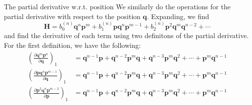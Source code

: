 \documentclass[aspectratio=169]{beamer}
\begin{document}
	\begin{frame}[allowframebreaks]{The partial derivative w.r.t. position}
		We similarly do the operations for the partial derivative with respect to the position $\textbf{q}$.
		Expanding, we find
		\begin{equation}
			\textbf{H}=b_0^{(n)}\textbf{q}^n\textbf{p}^m+b_1^{(n)}\textbf{p}\textbf{q}^n\textbf{p}^{m-1}+b_2^{(n)}\textbf{p}^2\textbf{q}^m\textbf{q}^{n-2}+\cdots
		\end{equation}
		and find the derivative of each term using two definitons of the partial derivative. For the first definition, we have the following:
		\begin{align}
			\left(\frac{\partial\textbf{q}^m\textbf{p}^n}{\partial\textbf{q}}\right)_1&=\textbf{q}^{n-1}\textbf{p}+\textbf{q}^{n-2}\textbf{p}^m\textbf{q}+\textbf{q}^{n-3}\textbf{p}^m\textbf{q}^{2}+\cdots+\textbf{p}^m\textbf{q}^{n-1} \\
			\left(\frac{\partial\textbf{p}\textbf{q}^n\textbf{p}^{m-1}}{\partial\textbf{q}}\right)_1&=\textbf{q}^{n-1}\textbf{p}+\textbf{q}^{n-2}\textbf{p}^m\textbf{q}+\textbf{q}^{n-3}\textbf{p}^m\textbf{q}^{2}+\cdots+\textbf{p}^m\textbf{q}^{n-1} \\
			\left(\frac{\partial\textbf{p}^2\textbf{q}^n\textbf{p}^{m-2}}{\partial\textbf{p}}\right)_1&=\textbf{q}^{n-1}\textbf{p}+\textbf{q}^{n-2}\textbf{p}^m\textbf{q}+\textbf{q}^{n-3}\textbf{p}^m\textbf{q}^{2}+\cdots+\textbf{p}^m\textbf{q}^{n-1}
		\end{align}
		

\end{frame}
\end{document}
